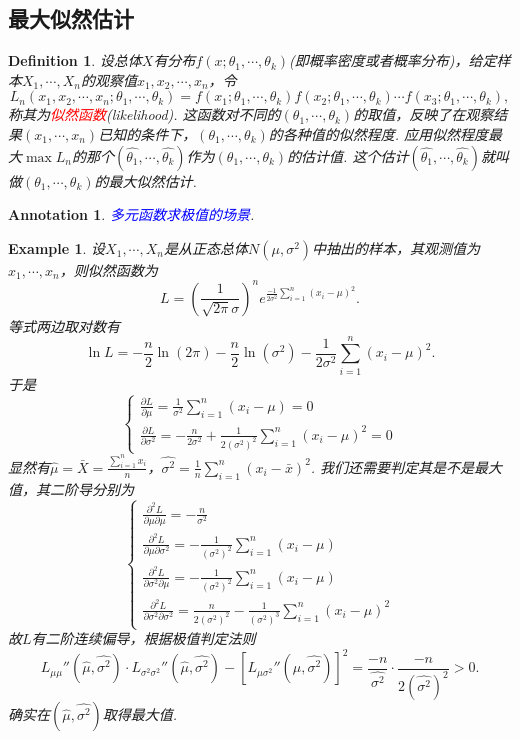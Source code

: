 \documentclass{article}
\newtheorem{example}[theorem]{Example}
\newtheorem{definition}[theorem]{Definition}
\newtheorem{annotation}[theorem]{Annotation}
\newcommand{\redt}[1]{\textcolor{red}{#1}}
\newcommand{\bluet}[1]{\textcolor{blue}{#1}}
\begin{document}
\subsection{最大似然估计}

\begin{definition}
\rm 设总体$X$有分布$f(x;\theta_1,\cdots,\theta_k)$(即概率密度或者概率分布)，给定样本$X_1,\cdots,X_n$的观察值$x_1,x_2,\cdots,x_n$，令
$$
L_n(x_1,x_2,\cdots,x_n;\theta_1,\cdots,\theta_k) = f(x_1;\theta_1,\cdots,\theta_k)f(x_2;\theta_1,\cdots,\theta_k)\cdots f(x_3;\theta_1,\cdots,\theta_k),
$$
称其为\redt{似然函数}(likelihood). 这函数对不同的$(\theta_1,\cdots,\theta_k)$的取值，反映了在观察结果$(x_1,\cdots,x_n)$已知的条件下，$(\theta_1,\cdots,\theta_k)$的各种值的似然程度. 应用似然程度最大$\max{L_n}$的那个$(\widehat{\theta_1},\cdots,\widehat{\theta_k})$作为$(\theta_1,\cdots,\theta_k)$的估计值. 这个估计$(\widehat{\theta_1},\cdots,\widehat{\theta_k})$就叫做$(\theta_1,\cdots,\theta_k)$的最大似然估计. 
\end{definition}

\begin{annotation}
\rm \bluet{多元函数求极值的场景}.
\end{annotation}

\begin{example}
\rm 设$X_1,\cdots,X_n$是从正态总体$N(\mu,\sigma^2)$中抽出的样本，其观测值为$x_1,\cdots,x_n$，则似然函数为
$$
L = \left(\frac{1}{\sqrt{2\pi}\sigma}\right)^ne^{\frac{-1}{2\sigma^2}\sum\limits_{i =1}^n (x_i-\mu)^2}.
$$
等式两边取对数有
$$
\ln L =-\frac{n}{2}\ln(2\pi)-\frac{n}{2}\ln(\sigma^2) - \frac{1}{2\sigma^2}\sum\limits_{i =1}^n (x_i-\mu)^2.
$$
于是
$$
\left\{
\begin{array}{ll}
\frac{\partial L}{\partial \mu} = \frac{1}{\sigma^2}\sum\limits_{i =1}^n (x_i-\mu) = 0 \\
\frac{\partial L}{\partial \sigma^2} = - \frac{n}{2\sigma^2} +\frac{1}{2(\sigma^2)^2} \sum\limits_{i =1}^n (x_i-\mu)^2 = 0
\end{array}\right.
$$
显然有$\widehat{\mu} = \bar{X} = \frac{\sum\limits_{i =1}^n x_i}{n}$，$\widehat{\sigma^2} = \frac{1}{n}\sum\limits_{i =1}^n (x_i-\bar{x})^2$. 我们还需要判定其是不是最大值，其二阶导分别为
$$
\left\{
\begin{array}{ll}
\frac{\partial^2L}{\partial \mu\partial \mu} = -\frac{n}{\sigma^2} \\
\frac{\partial^2L}{\partial \mu \partial \sigma^2} =  -\frac{1}{(\sigma^2)^2}\sum\limits_{i =1}^n (x_i-\mu) \\
\frac{\partial^2L}{\partial \sigma^2 \partial \mu} = -\frac{1}{(\sigma^2)^2}\sum\limits_{i =1}^n (x_i-\mu) \\
\frac{\partial^2L}{\partial \sigma^2 \partial \sigma^2} =  \frac{n}{2(\sigma^2)^2} - \frac{1}{(\sigma^2)^3}\sum\limits_{i =1}^n (x_i-\mu)^2
\end{array}\right.
$$
故$L$有二阶连续偏导，根据极值判定法则
$$
L_{\mu\mu}''(\widehat{\mu},\widehat{\sigma^2})\cdot L_{\sigma^2\sigma^2}''(\widehat{\mu},\widehat{\sigma^2}) - \left[L_{\mu\sigma^2}''(\widehat{\mu},\widehat{\sigma^2})\right]^2 = \frac{-n}{\widehat{\sigma^2}}\cdot\frac{-n}{2(\widehat{\sigma^2})^2} > 0.
$$
确实在$(\widehat{\mu},\widehat{\sigma^2})$取得最大值.
\end{example}
\end{document}

